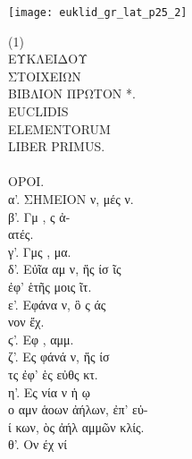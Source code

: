 \texttt{[image: euklid\_gr\_lat\_p25\_2]}
\clearpage

\begin{typeLatin}
 (1)\bold{>} \\
ΕΥΚΛΕΙΔΟΥ \\
ΣΤΟΙΧΕΙΩΝ \\
ΒΙΒΛΙΟΝ ΠΡΩΤΟΝ  *\bold{>}. \\
EUCLIDIS\\
ELEMENTORUM\\
LIBER PRIMUS.\\
\\
ΟΡΟΙ.\\
α'. ΣΗΜΕΙΟΝ ν,  μές ν. \\
β'. Γμ , ς ἀ- \\ 
ατές. \\
γ'. Γμς  , μα. \\
δ'. Εὐῖα αμ ν, ἥς ίσ ῖς \\ 
ἐφ' ἑτῆς μοις ῖτ. \\
ε'. Εφάνα  ν, ὃ ς  άς \\ 
νον ἔχ. \\
ϛ'. Εφ  , αμμ. \\
ζ'. Ες φάνά ν, ἥς ίσ \\ 
τς ἐφ' ἑς εὐθς κτ. \\
η'. Ες  νία ν ἡ  ῳ \\ 
ο αμν ἁοων ἀήλων,   ἐπ' εὐ- \\ 
ί κων, ὸς ἀήλ  αμμῶν κλίς. \\
θ'. Ον   έχ  νί \\ 

\end{typeLatin}
